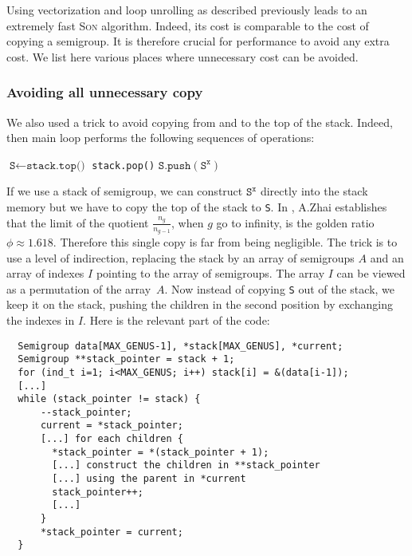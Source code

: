 \documentclass[reqno]{amsart}
\theoremstyle{plain}
\theoremstyle{definition}
\renewcommand{\tt}[1]{\texttt{#1}}
\begin{document}
Using vectorization and loop unrolling as described previously leads to an
extremely fast \textsc{Son} algorithm. Indeed, its cost is comparable to the cost
of copying a semigroup. It is therefore crucial for performance to avoid any
extra cost. We list here various places where unnecessary cost can be avoided.



\subsubsection*{Avoiding all unnecessary copy} We also used a trick to avoid
copying from and to the top of the stack. Indeed, then main loop performs the
following sequences of operations:

\vspace{1em}

{\small
\begin{algorithmic}
  \State $\tt{S} \gets \tt{stack.top()}$
  \State \tt{stack.pop()}
  \For{all children $\tt{S}^\tt{x}$ of \tt{S}}
  \State $\tt{S.push}(\tt{S}^\tt{x})$
  \EndFor
\end{algorithmic}
}

\vspace{0.5em}

If we use a stack of semigroup, we can construct $\tt{S}^\tt{x}$ directly into
the stack memory but we have to copy the top of the stack to \tt{S}. 
In \cite{Zhai}, A.Zhai establishes that the limit of the quotient   $\frac{n_g}{n_{g-1}}$, when $g$ go to infinity, is the golden ratio $\phi\approx 1.618$. Therefore this single copy is far from
being negligible. The trick is to use a level of indirection, replacing the
stack by an array of semigroups $A$ and an array of indexes $I$ pointing to the array of
semigroups. The array $I$ can be viewed as a permutation of
the array~$A$. Now instead of copying \tt{S} out of the stack, we keep
it on the stack, pushing the children in the second position by exchanging the
indexes in $I$. Here is the relevant part of the code:

\vspace{0.5em}

{\small
\begin{verbatim}
  Semigroup data[MAX_GENUS-1], *stack[MAX_GENUS], *current;
  Semigroup **stack_pointer = stack + 1;
  for (ind_t i=1; i<MAX_GENUS; i++) stack[i] = &(data[i-1]);
  [...]
  while (stack_pointer != stack) {
      --stack_pointer;
      current = *stack_pointer;
      [...] for each children {
        *stack_pointer = *(stack_pointer + 1);
        [...] construct the children in **stack_pointer
        [...] using the parent in *current
        stack_pointer++;
        [...]
      }
      *stack_pointer = current;
  }
\end{verbatim}
}
\end{document}
